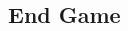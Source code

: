 \documentclass[12pt]{article}
\begin{document}
\begin{mdframed}[style = customFrame]
\begin{multicols*}{2}
\section*{End Game}

\end{multicols*}
\end{mdframed}
\end{document}
